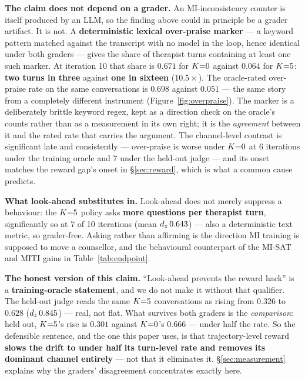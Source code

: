 \textbf{The claim does not depend on a grader.} An MI-inconsistency counter is itself produced by
an LLM, so the finding above could in principle be a grader artifact. It is not. A
\textbf{deterministic lexical over-praise marker} --- a keyword pattern matched against the
transcript with no model in the loop, hence identical under both graders --- gives the share of
therapist turns containing at least one such marker. At iteration 10 that share is
$\mathbf{0.671}$ for $K{=}0$ against $\mathbf{0.064}$ for $K{=}5$: \textbf{two turns in three} against
\textbf{one in sixteen} ($10.5\times$). The oracle-rated over-praise rate on the same
conversations is $0.698$ against $0.051$ --- the same story from a completely different instrument
(Figure~\ref{fig:overpraise}). The marker is a deliberately brittle keyword regex, kept as a
direction check on the oracle's counts rather than as a measurement in its own right; it is the
\emph{agreement} between it and the rated rate that carries the argument. The channel-level
contrast is significant late and consistently --- over-praise is worse under $K{=}0$ at 6 iterations
under the training oracle and 7 under the held-out judge --- and its onset matches the reward
gap's onset in \S\ref{sec:reward}, which is what a common cause predicts.

\textbf{What look-ahead substitutes in.} Look-ahead does not merely suppress a behaviour: the
$K{=}5$ policy asks \textbf{more questions per therapist turn}, significantly so at 7 of 10
iterations (mean $d_z\,0.643$) --- also a deterministic text metric, so grader-free. Asking rather
than affirming is the direction MI training is supposed to move a counsellor, and the behavioural
counterpart of the MI-SAT and MITI gains in Table~\ref{tab:endpoint}.

\textbf{The honest version of this claim.}
\label{sec:behaviour-honest}
``Look-ahead prevents the reward hack'' is a \textbf{training-oracle statement}, and we do not make
it without that qualifier. The held-out judge reads the same $K{=}5$ conversations as rising from
$0.326$ to $0.628$ ($d_z\,0.845$) --- real, not flat. What survives both graders is the
\emph{comparison}: held out, $K{=}5$'s rise is $0.301$ against $K{=}0$'s $0.666$ --- under half the
rate. So the defensible sentence, and the one this paper uses, is that trajectory-level reward
\textbf{slows the drift to under half its turn-level rate and removes its dominant channel
entirely} --- not that it eliminates it. \S\ref{sec:measurement} explains why the graders'
disagreement concentrates exactly here.
